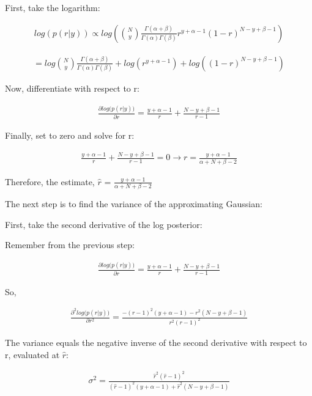 \documentclass[10pt]{article}
\begin{document}
\begin{itemize}
First, take the logarithm:

\begin{align*}
    log(p(r | y)) \propto log({N \choose y} \frac{\Gamma(\alpha + \beta)}{\Gamma(\alpha) \Gamma(\beta)}
    r^{y + \alpha - 1} (1 - r)^{N-y + \beta - 1}) 
\end{align*}

\begin{align*}
    = log{N \choose y} \frac{\Gamma(\alpha + \beta)}{\Gamma(\alpha) \Gamma(\beta)} +
    log(r^{y + \alpha - 1}) + log((1 - r)^{N-y + \beta - 1})
\end{align*}

Now, differentiate with respect to r:

\begin{align*}
    \frac{\partial log(p(r | y){)}}{\partial r} = 
    \frac{y + \alpha - 1}{r} +
    \frac{N - y + \beta - 1}{r - 1}
\end{align*}

Finally, set to zero and solve for r:

\begin{align*}
    \frac{y + \alpha - 1}{r} +
    \frac{N - y + \beta - 1}{r - 1} = 0
    \xrightarrow[]{}
     r = \frac{y + \alpha - 1}{\alpha + N + \beta - 2}
\end{align*}

Therefore, the estimate, $\hat{r}$ = $\frac{y + \alpha - 1}{\alpha + N + \beta - 2}$

The next step is to find the variance of the approximating Gaussian:

First, take the second derivative of the log posterior:

Remember from the previous step:

\begin{align*}
    \frac{\partial log(p(r | y){)}}{\partial r} = 
    \frac{y + \alpha - 1}{r} +
    \frac{N - y + \beta - 1}{r - 1}
\end{align*}

So, 

\begin{align*}
    \frac{\partial^2 log(p(r | y){)}}{\partial r^2} = 
    \frac{-(r-1)^2(y + \alpha - 1) - r^2(N - y + \beta - 1)}{r^2(r-1)^2}
\end{align*}

The variance equals the negative inverse of the second derivative with respect to r, evaluated at $\hat{r}$:

\begin{align*}
    \sigma^2 = 
    \frac{\hat{r}^2(\hat{r}-1)^2}{(\hat{r}-1)^2(y+\alpha-1)+\hat{r}^2(N-y+\beta-1)}
\end{align*}


\end{itemize}
\end{document}
